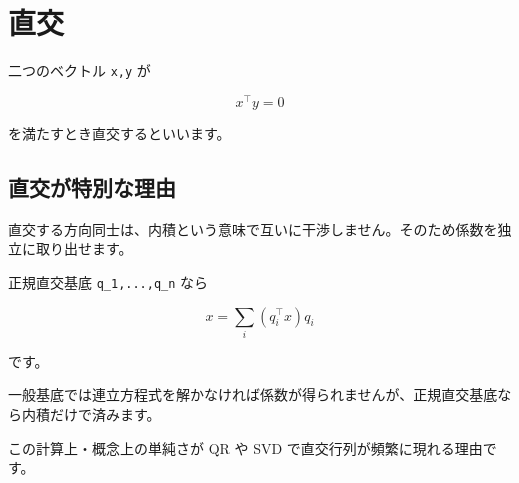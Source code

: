 \documentclass[
  11pt,
  a4paper,
]{ltjsarticle}
\author{}
\date{}
\begin{document}
\hypertarget{ux76f4ux4ea4}{%
\section{直交}\label{ux76f4ux4ea4}}

二つのベクトル \texttt{x,y} が

\[
x^\top y=0
\]

を満たすとき直交するといいます。

\hypertarget{ux76f4ux4ea4ux304cux7279ux5225ux306aux7406ux7531}{%
\subsection{直交が特別な理由}\label{ux76f4ux4ea4ux304cux7279ux5225ux306aux7406ux7531}}

直交する方向同士は、内積という意味で互いに干渉しません。そのため係数を独立に取り出せます。

正規直交基底 \texttt{q\_1,...,q\_n} なら

\[
x=\sum_i(q_i^\top x)q_i
\]

です。

一般基底では連立方程式を解かなければ係数が得られませんが、正規直交基底なら内積だけで済みます。

この計算上・概念上の単純さが QR や SVD
で直交行列が頻繁に現れる理由です。
\end{document}
